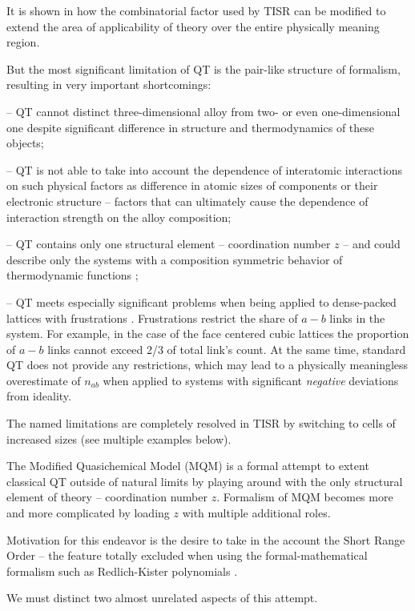 \documentclass[12pt,abstract]{scrartcl}
\begin{document}
It is shown in \cite{TISR_p4} how the combinatorial factor used by TISR can be modified to extend the area of  applicability of theory  over the entire physically meaning region.

But the most significant limitation of QT is the pair-like structure of formalism, resulting in very important shortcomings:

--  QT cannot distinct three-dimensional alloy from two- or even one-dimensional one despite significant difference in  structure and thermodynamics of these objects;

-- QT is not able to take into account the dependence of interatomic interactions on such physical factors as  difference in atomic sizes of components or  their electronic structure -- factors that can ultimately cause the dependence of interaction strength on the alloy composition;


-- QT contains only one structural element -- coordination number $z$ -- and could describe only the systems with a composition symmetric  behavior of thermodynamic functions \cite{Hillert2008,GUGGENHEIM1952};

-- QT meets especially significant problems  when being applied to dense-packed lattices with frustrations \cite{jean-francoissadoc1999,TISR_p4}.
Frustrations restrict the share of  $a - b$  links in the system. For example, in the case of the face centered cubic lattices the proportion of $a - b$ links cannot exceed 2/3 of total link's count. At the same time, standard QT  does not provide any restrictions, which may lead to a physically meaningless  overestimate of $ n_ {ab} $ when applied to systems with significant \textit{negative} deviations from ideality.


The named limitations are completely resolved in TISR by switching to cells of increased sizes (see multiple examples below).


The Modified Quasichemical Model (MQM) \cite{Pelton1986,Pelton2007, Pelton_p1} is a formal attempt to extent  classical QT outside of natural limits by playing around with the only structural element of theory -- coordination number $z$. 
Formalism of MQM becomes more and more complicated by loading $z$ with multiple additional roles.

Motivation for this endeavor is the desire to take in the account the Short Range Order -- the feature totally excluded when using the formal-mathematical formalism such as Redlich-Kister polynomials \cite{Redlich1949}.

We must distinct two almost unrelated aspects of this attempt. 
\end{document}
